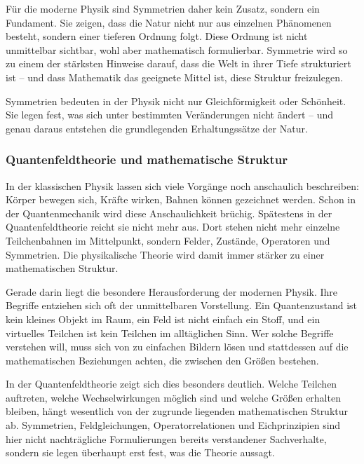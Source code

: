 Für die moderne Physik sind Symmetrien daher kein Zusatz, sondern ein Fundament. Sie zeigen, dass die Natur nicht nur aus einzelnen Phänomenen besteht, sondern einer tieferen Ordnung folgt. Diese Ordnung ist nicht unmittelbar sichtbar, wohl aber mathematisch formulierbar. Symmetrie wird so zu einem der stärksten Hinweise darauf, dass die Welt in ihrer Tiefe strukturiert ist -- und dass Mathematik das geeignete Mittel ist, diese Struktur freizulegen.

\begin{DidacticBox}

	\label{box:symmetrie-erhaltung}
	Symmetrien bedeuten in der Physik nicht nur Gleichförmigkeit oder Schönheit. Sie legen fest, was sich unter bestimmten Veränderungen nicht ändert -- und genau daraus entstehen die grundlegenden Erhaltungssätze der Natur.
\end{DidacticBox}

\subsubsection{Quantenfeldtheorie und mathematische Struktur}

In der klassischen Physik lassen sich viele Vorgänge noch anschaulich beschreiben: Körper bewegen sich, Kräfte wirken, Bahnen können gezeichnet werden. Schon in der Quantenmechanik wird diese Anschaulichkeit brüchig. Spätestens in der Quantenfeldtheorie reicht sie nicht mehr aus. Dort stehen nicht mehr einzelne Teilchenbahnen im Mittelpunkt, sondern Felder, Zustände, Operatoren und Symmetrien. Die physikalische Theorie wird damit immer stärker zu einer mathematischen Struktur.

Gerade darin liegt die besondere Herausforderung der modernen Physik. Ihre Begriffe entziehen sich oft der unmittelbaren Vorstellung. Ein Quantenzustand ist kein kleines Objekt im Raum, ein Feld ist nicht einfach ein Stoff, und ein virtuelles Teilchen ist kein Teilchen im alltäglichen Sinn. Wer solche Begriffe verstehen will, muss sich von zu einfachen Bildern lösen und stattdessen auf die mathematischen Beziehungen achten, die zwischen den Größen bestehen.

In der Quantenfeldtheorie zeigt sich dies besonders deutlich. Welche Teilchen auftreten, welche Wechselwirkungen möglich sind und welche Größen erhalten bleiben, hängt wesentlich von der zugrunde liegenden mathematischen Struktur ab. Symmetrien, Feldgleichungen, Operatorrelationen und Eichprinzipien sind hier nicht nachträgliche Formulierungen bereits verstandener Sachverhalte, sondern sie legen überhaupt erst fest, was die Theorie aussagt.

